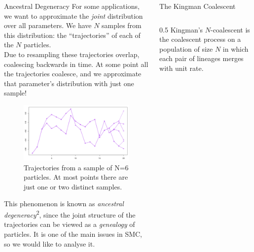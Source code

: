 \documentclass[final, 12pt]{beamer}
\newlength{\colwidth}
\begin{document}
\begin{frame}
\begin{columns}
\begin{column}{\colwidth}
\begin{block}{Ancestral Degeneracy}
For some applications, we want to approximate the \emph{joint} distribution over all parameters.
We have $N$ samples from this distribution: the ``trajectories'' of each of the $N$ particles.\\[12pt]

Due to resampling these trajectories overlap, coalescing backwards in time. At some point all the trajectories coalesce, and we approximate that parameter's distribution with just one sample!

\begin{figure} %
\includegraphics[width=0.9\colwidth]{../degeneracy.pdf}
\caption{Trajectories from a sample of N=6 particles. At most points there are just one or two distinct samples.}
\end{figure}

This phenomenon is known as \emph{ancestral degeneracy}\textsuperscript{2}, since the joint structure of the trajectories can be viewed as a \emph{genealogy} of particles. It is one of the main issues in SMC, so we would like to analyse it.
\end{block}
\end{column}

\begin{column}{\colwidth}
\vspace*{5pt}

\begin{block}{The Kingman Coalescent}
\begin{columns}
\begin{column}{0.5\colwidth}
Kingman's $N$-coalescent is the coalescent process on a population of size $N$ in which each pair of lineages merges with unit rate.\\[12pt]


\end{column}
\end{columns}
\end{block}
\end{column}
\end{columns}
\end{frame}
\end{document}
